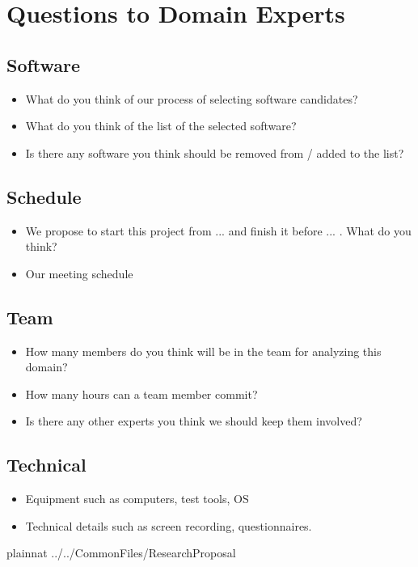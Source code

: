 \documentclass{article}
\theoremstyle{definition}
\begin{document}
\section{Questions to Domain Experts}

\subsection{Software}
\begin{itemize}
\item What do you think of our process of selecting software candidates?
\item What do you think of the list of the selected software?
\item Is there any software you think should be removed from / added to the
list?
\end{itemize}

\subsection{Schedule}
\begin{itemize}
\item We propose to start this project from ... and finish it before ... . What
do you think?
\item Our meeting schedule
\end{itemize}

\subsection{Team}
\begin{itemize}
\item How many members do you think will be in the team for analyzing this
domain?
\item How many hours can a team member commit?
\item Is there any other experts you think we should keep them involved?
\end{itemize}

\subsection{Technical}
\begin{itemize}
\item Equipment such as computers, test tools, OS
\item Technical details such as screen recording, questionnaires.
\end{itemize}

\newpage

 {plainnat}
 {../../CommonFiles/ResearchProposal}
\end{document}
